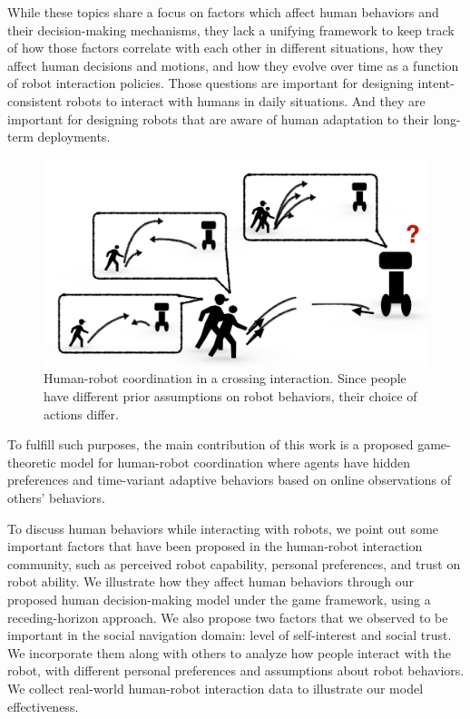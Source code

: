 \documentclass[letterpaper, 10 pt, conference]{ieeeconf}  %
\begin{document}
While these topics share a focus on factors which affect human behaviors and 
their decision-making mechanisms, 
they lack a unifying framework to keep track of how those factors correlate with 
each other in different situations, how they affect human 
decisions and motions, and 
how they evolve over time as a function of robot interaction policies. 
Those questions are important for designing intent-consistent robots to 
interact with humans in daily situations. And they are important for 
designing 
robots that are aware of human 
adaptation to their long-term deployments.  
   \begin{figure}[t]
      \centering
      \vspace{-1em}
      \includegraphics[scale=0.32]{intro}
      \vspace{-1.5em}
      \caption{Human-robot coordination in a crossing interaction. Since 
      people have different prior assumptions on robot behaviors, their choice 
      of actions differ.}
      \vspace{-2em}
    \label{fig:intro}
   \end{figure}
To fulfill such purposes, the main contribution of this work is a proposed game-theoretic 
model for human-robot coordination where agents have hidden preferences and time-variant adaptive behaviors based 
on online observations of others' behaviors.

To discuss human behaviors while interacting with robots, we point out some
important factors that have been proposed in the human-robot interaction 
community, such as perceived robot capability, personal preferences, and 
trust on robot ability. We illustrate how they affect human behaviors through 
our proposed human decision-making model under the game framework, using a 
receding-horizon approach. We also propose two factors that we observed to be 
important in the social navigation 
domain: level of self-interest and social trust. We incorporate them along 
with others to analyze how people interact with the robot, with different 
personal preferences and assumptions about robot 
behaviors. We collect real-world human-robot interaction data to 
illustrate our model effectiveness. 
\end{document}

